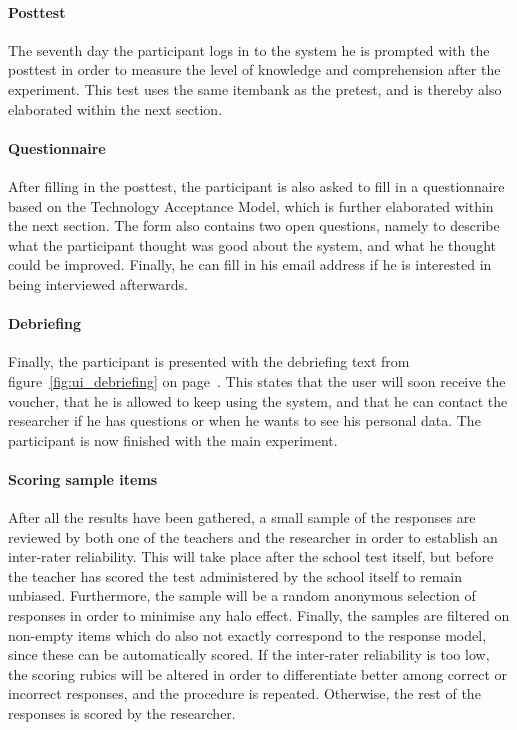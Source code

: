 \paragraph{Posttest} The seventh day the participant logs in to the system he is prompted with the posttest in order to measure the level of knowledge and comprehension after the experiment. This test uses the same itembank as the pretest, and is thereby also elaborated within the next section.

\paragraph{Questionnaire} After filling in the posttest, the participant is also asked to fill in a questionnaire based on the Technology Acceptance Model, which is further elaborated within the next section. The form also contains two open questions, namely to describe what the participant thought was good about the system, and what he thought could be improved. Finally, he can fill in his email address if he is interested in being interviewed afterwards.

\paragraph{Debriefing} Finally, the participant is presented with the debriefing text from figure~\ref{fig:ui_debriefing} on page~\pageref{fig:ui_debriefing}. This states that the user will soon receive the voucher, that he is allowed to keep using the system, and that he can contact the researcher if he has questions or when he wants to see his personal data. The participant is now finished with the main experiment.

\paragraph{Scoring sample items} After all the results have been gathered, a small sample of the responses are reviewed by both one of the teachers and the researcher in order to establish an inter-rater reliability. This will take place after the school test itself, but before the teacher has scored the test administered by the school itself to remain unbiased. Furthermore, the sample will be a random anonymous selection of responses in order to minimise any halo effect. Finally, the samples are filtered on non-empty items which do also not exactly correspond to the response model, since these can be automatically scored. If the inter-rater reliability is too low, the scoring rubics will be altered in order to differentiate better among correct or incorrect responses, and the procedure is repeated. Otherwise, the rest of the responses is scored by the researcher.

